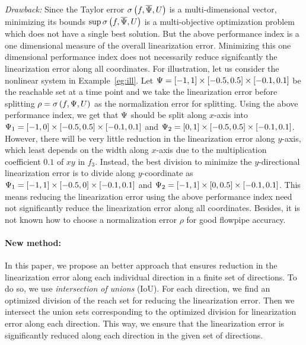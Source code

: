 \emph{Drawback:}  Since the Taylor error
$\sigma\left(f,\overline{\Psi},U\right)$ is a multi-dimensional vector, minimizing its
bounds $\sup{\sigma\left(f,\overline{\Psi},U\right)}$ is a multi-objective optimization
problem which does not have a single best solution.  But the above
performance index is a one dimensional measure of the overall
linearization error.  Minimizing this one dimensional performance
index does not necessarily reduce signifcantly the linearization error
along all coordinates.  For illustration, let us consider the
nonlinear system in Example~\ref{eg:ill}.  Let $\Psi =
[-1,1]\times[-0.5,0.5]\times[-0.1,0.1]$ be the reachable set at a time
point and we take the linearization error before splitting $\rho
= \sigma\left(f,\Psi,U\right)$ as the normalization error for splitting.
Using the above performance index, we get that $\Psi$ should be split
along $x$-axis into $\Psi_1 = [-1,0]\times[-0.5,0.5]\times[-0.1,0.1]$
and $\Psi_2 = [0,1]\times[-0.5,0.5]\times[-0.1,0.1]$.  However, there
will be very little reduction in the linearization error along
$y$-axis, which least depends on the width along $x$-axis due to the
multiplication coefficient $0.1$ of $xy$ in $f_3$.  Instead, the best
division to minimize the $y$-directional linearization error is to
divide along $y$-coordinate as $\Psi_1 =
[-1,1]\times[-0.5,0]\times[-0.1,0.1]$ and $\Psi_2 =
[-1,1]\times[0,0.5]\times[-0.1,0.1]$.  This means reducing the
linearization error using the above performance index need not
significantly reduce the linearization error along all coordinates.
Besides, it is not known how to choose a normalization error $\rho$
for good flowpipe accuracy.

\paragraph{New method:}  In this paper, we propose an better approach
that ensures reduction in the linearization error along each
individual direction in a finite set of directions.  To do so, we
use \emph{intersection of unions} (IoU).  For each direction, we find
an optimized division of the reach set for reducing the linearization
error.  Then we intersect the union sets corresponding to the
optimized division for linearization error along each direction.  This
way, we ensure that the linearization error is significantly reduced
along each direction in the given set of directions.

